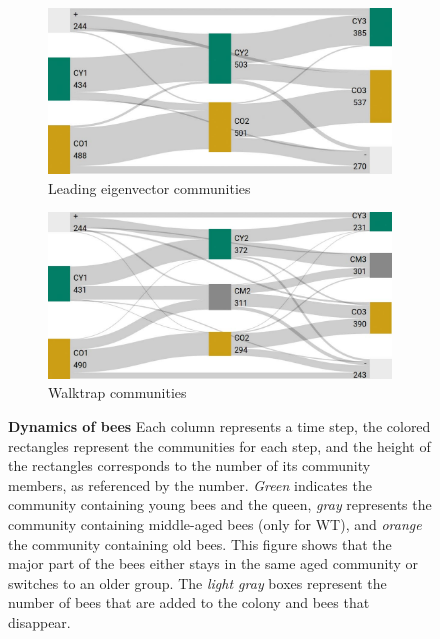 \begin{figure}[htbp]
	\centering
	\begin{subfigure}[b]{1\textwidth}
	\centering
	\includegraphics[width=1\textwidth]{Figures/LE_matching.pdf}
	\caption[Leading eigenvector communities]{Leading eigenvector communities}
	\label{fig:membersLE}
	\vspace*{10mm}
	\end{subfigure} 
	\begin{subfigure}[b]{1\textwidth}
	\centering
	\includegraphics[width=1\textwidth]{Figures/WT_matching.pdf}
	\caption[Walktrap communities]{Walktrap communities}
	\label{fig:membersWT}
	\vspace*{5mm}
	\end{subfigure}
	\caption[Dynamics of bees]{\textbf{Dynamics of bees} 
	Each column represents a time step, the colored rectangles represent the communities for each step, and the height of the rectangles corresponds to the number of its community members, as referenced by the number. \emph{Green} indicates the community containing young bees and the queen, \emph{gray} represents the community containing middle-aged bees (only for WT), and \emph{orange} the community containing old bees. This figure shows that the major part of the bees either stays in the same aged community or switches to an older group. The \emph{light gray} boxes represent the number of bees that are added to the colony and bees that disappear.}
	\label{fig:members}
\end{figure}
